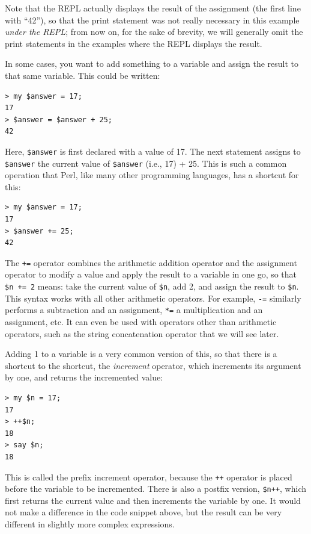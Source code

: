Note that the REPL actually displays the result of the 
assignment (the first line with ``42''), so that the 
print statement was not really necessary in this 
example \emph{under the REPL}; from now on, for the sake of 
brevity, we will generally omit the print statements in the 
examples where the REPL displays the result.

In some cases, you want to add something to a variable 
and assign the result to that same variable. This could 
be written:

\begin{verbatim}
> my $answer = 17;
17
> $answer = $answer + 25;
42
\end{verbatim}
%

Here, \verb"$answer" is first declared with a value of 17. The next 
statement assigns to \verb"$answer" the current value of 
\verb"$answer" (i.e., 17) + 25. This is such a common operation 
that Perl, like many other programming languages, has a 
shortcut for this:

\begin{verbatim}
> my $answer = 17;
17
> $answer += 25;
42
\end{verbatim}
%

The \verb"+=" operator combines the arithmetic addition operator 
and the assignment operator to modify a value and apply the result 
to a variable in one go, so that \verb"$n += 2" means: take 
the current value of \verb"$n", add 2, and assign the result to 
\verb"$n". This syntax works with all other arithmetic operators. 
For example, \verb"-=" similarly performs a subtraction and an 
assignment, \verb"*=" a multiplication and an assignment, etc. It 
can even be used with operators other than arithmetic operators, 
such as the string concatenation operator that we will see later.

Adding 1 to a variable is a very common version of this, so that 
there is a shortcut to the shortcut, the \emph{increment} operator, 
which increments its argument by one, and returns the incremented value:

\begin{verbatim}
> my $n = 17;
17
> ++$n;
18
> say $n;
18
\end{verbatim}
%
This is called the prefix increment operator, because the \verb"++" 
operator is placed before the variable to be incremented. There is 
also a postfix version, \verb"$n++", which first returns the current 
value and then increments the variable by one. It would not make 
a difference in the code snippet above, but the result can be very different 
in slightly more complex expressions. 

